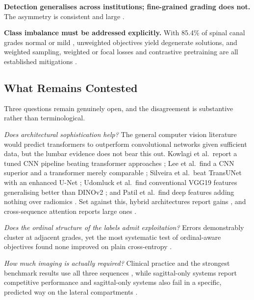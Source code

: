 \textbf{Detection generalises across institutions; fine-grained grading does
not.} The asymmetry is consistent and large
\cite{zhang2023deep,wu2026external,yilihamu2025quantification}.

\textbf{Class imbalance must be addressed explicitly.} With 85.4\% of spinal
canal grades normal or mild \cite{richards2026the}, unweighted objectives yield
degenerate solutions, and weighted sampling, weighted or focal losses and
contrastive pretraining are all established mitigations
\cite{lin2017focal,acharya2026disccentric}.

\subsection{What Remains Contested}
\label{sec:lr-contested}

Three questions remain genuinely open, and the disagreement is substantive
rather than terminological.

\emph{Does architectural sophistication help?} The general computer vision
literature would predict transformers to outperform convolutional networks given
sufficient data, but the lumbar evidence does not bear this out. Kowlagi et al.\
report a tuned CNN pipeline beating transformer approaches \cite{kowlagi2022a};
Lee et al.\ find a CNN superior and a transformer merely comparable
\cite{lee2026deep}; Silveira et al.\ beat TransUNet with an enhanced U-Net
\cite{silveira2025automated}; Udomluck et al.\ find conventional VGG19 features
generalising better than DINOv2 \cite{udomluck2026multitask}; and Patil et al.\
find deep features adding nothing over radiomics \cite{patil2026mribased}. Set
against this, hybrid architectures report gains
\cite{chen2024symtc,zheng2022deep}, and cross-sequence attention reports large
ones \cite{nguyen2026crossspine}.

\emph{Does the ordinal structure of the labels admit exploitation?} Errors
demonstrably cluster at adjacent grades, yet the most systematic test of
ordinal-aware objectives found none improved on plain cross-entropy
\cite{niemeyer2021a}.

\emph{How much imaging is actually required?} Clinical practice and the strongest
benchmark results use all three sequences
\cite{richards2026the,batra2025mscan}, while sagittal-only systems report
competitive performance \cite{acharya2026disccentric,kowlagi2022a} and
sagittal-only systems also fail in a specific, predicted way on the lateral
compartments \cite{nigru2024external}.

